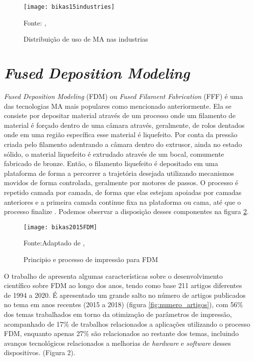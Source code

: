 \begin{figure}[!htb]
    \begin{center}
    \caption{Distribuição de uso de MA nas industrias}
    \texttt{[image: bikas15industries]}

    {\footnotesize Fonte: \citeauthor{bikas16}, \citeyear{bikas16}}
    \label{fig:MA_industrias}
    \end{center}
\end{figure}

\section{\textit{Fused Deposition Modeling}}
\textit{Fused Deposition Modeling} (FDM) ou \textit{Fused Filament Fabrication} 
(FFF) é uma das tecnologias MA mais populares como mencionado anteriormente.
Ela se consiste por depositar material através de um processo 
onde um filamento de material é forçado dentro de uma câmara através,
geralmente, de rolos dentados onde em uma região específica esse 
material é liquefeito. Por conta da pressão criada pelo filamento 
adentrando a câmara dentro do extrusor, ainda no estado sólido, 
o material liquefeito é extrudado através de um bocal, 
comumente fabricado de bronze. Então, o filamento liquefeito é 
depositado em uma plataforma de forma a percorrer a trajetória 
desejada utilizando mecanismos movidos de forma controlada, 
geralmente por motores de passos. O processo é repetido camada 
por camada, de forma que elas estejam apoiadas por camadas 
anteriores e a primeira camada continue fixa na plataforma ou 
cama, até que o processo finalize \cite{turner14}.
Podemos observar a disposição desses componentes na figura \ref{fig:fdm_ex}.

\begin{figure}[!htb]
    \begin{center}
    \caption{Principio e processo de impressão para FDM}
    \texttt{[image: bikas2015FDM]}

    {\footnotesize Fonte:Adaptado de \citeauthor{bikas16}, \citeyear{bikas16}}
    \label{fig:fdm_ex}
    \end{center}
\end{figure}

O trabalho de \cite{vyavahare20} apresenta algumas 
características sobre o desenvolvimento científico sobre 
FDM ao longo dos anos, tendo como base 211 artigos diferentes 
de 1994 a 2020. É apresentado um grande salto no número de 
artigos publicados no tema em anos recentes (2015 a 2018) 
(figura \ref{fig:numero_artigos}), com 56\% dos temas trabalhados em torno da 
otimização de parâmetros de impressão, acompanhado de 17\% de 
trabalhos relacionados a aplicações utilizando o processo FDM, enquanto apenas 27\%
são relacionados ao restante dos temas, incluindo avanços tecnológicos relacionados
a melhorias de \textit{hardware} e \textit{software} desses dispositivos.
(Figura 2).

